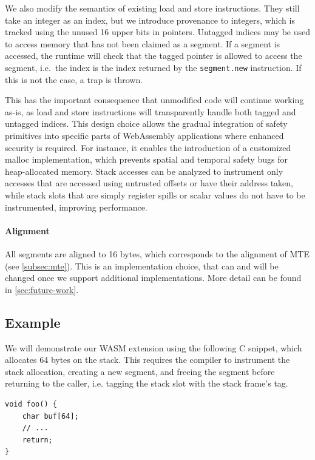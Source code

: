 We also modify the semantics of existing load and store instructions.
They still take an integer as an index, but we introduce provenance to integers, which is tracked using the unused 16 upper bits in pointers.
Untagged indices may be used to access memory that has not been claimed as a segment.
If a segment is accessed, the runtime will check that the tagged pointer is allowed to access the segment, i.e.\ the index is the index returned by the \texttt{segment.new} instruction.
If this is not the case, a trap is thrown.

This has the important consequence that unmodified code will continue working as-is, as load and store instructions will transparently handle both tagged and untagged indices.
This design choice allows the gradual integration of safety primitives into specific parts of WebAssembly applications where enhanced security is required.
For instance, it enables the introduction of a customized malloc implementation, which prevents spatial and temporal safety bugs for heap-allocated memory.
Stack accesses can be analyzed to instrument only accesses that are accessed using untrusted offsets or have their address taken, while stack slots that are simply register spills or scalar values do not have to be instrumented, improving performance.

\paragraph{Alignment}
All segments are aligned to 16 bytes, which corresponds to the alignment of MTE (see \cref{subsec:mte}).
This is an implementation choice, that can and will be changed once we support additional implementations.
More detail can be found in \cref{sec:future-work}.

\subsection{Example}
\label{subsec:example}

We will demonstrate our \ac{WASM} extension using the following C snippet, which allocates 64 bytes on the stack.
This requires the compiler to instrument the stack allocation, creating a new segment, and freeing the segment before returning to the caller, i.e. tagging the stack slot with the stack frame's tag.

\begin{lstlisting}[frame=h,style=customc,
    label={lst:wasm-example-c}]
void foo() {
    char buf[64];
    // ...
    return;
}
\end{lstlisting}

